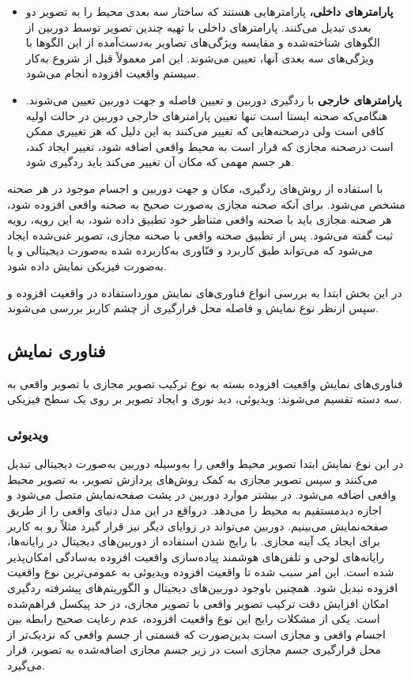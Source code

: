 \begin{itemize}
	\item \textbf{پارامترهای داخلی، }
 پارامترهایی هستند که ساختار سه بعدی محیط را به تصویر دو بعدی تبدیل می‌کنند. پارامترهای داخلی با تهیه چندین تصویر توسط دوربین از الگوهای شناخته‌شده و مقایسه ویژگی‌های تصاویر به‌دست‌آمده از این الگوها با ویژگی‌های سه بعدی آنها، تعیین می‌شوند. این امر معمولاً قبل از شروع به‌کار سیستم واقعیت افزوده انجام می‌شود.
 \item \textbf{پارامترهای خارجی}
   با ردگیری دوربین و تعیین فاصله و جهت دوربین تعیین می‌شوند. هنگامی‌که صحنه ایستا است تنها تعیین پارامترهای خارجی دوربین در حالت اولیه کافی است ولی درصحنه‌هایی که تغییر می‌کنند به این دلیل که هر تغییری ممکن است درصحنه مجازی که قرار است به محیط واقعی اضافه شود، تغییر ایجاد کند، هر جسم مهمی که مکان آن تغییر می‌کند باید ردگیری شود\cite{Billinghurst}.
\end{itemize}
با استفاده از روش‌های ردگیری، مکان و جهت دوربین و اجسام موجود در هر صحنه مشخص می‌شود. برای آنکه صحنه مجازی به‌صورت صحیح به صحنه واقعی افزوده شود، هر صحنه مجازی باید با صحنه واقعی متناظر خود تطبیق داده شود، به این رویه، رویه ثبت گفته می‌شود. پس از تطبیق صحنه واقعی با صحنه مجازی، تصویر غنی‌شده ایجاد می‌شود که می‌تواند طبق کاربرد و فنّاوری به‌کاربرده شده به‌صورت دیجیتالی و یا به‌صورت فیزیکی نمایش داده شود.

در این بخش ابتدا به بررسی انواع فناوری‌های نمایش مورداستفاده در واقعیت افزوده و سپس ازنظر نوع نمایش و فاصله محل قرارگیری از چشم کاربر بررسی می‌شوند.
\subsection{فناوری نمایش}
فناوری‌های نمایش واقعیت افزوده بسته به نوع ترکیب تصویر مجازی با تصویر واقعی به سه دسته تقسیم می‌شوند: ویدیوئی، دید نوری و ایجاد تصویر بر روی یک سطح فیزیکی.
\subsubsection{ویدیوئی}
در این نوع نمایش ابتدا تصویر محیط واقعی را به‌وسیله دوربین به‌صورت دیجیتالی تبدیل می‌کنند و سپس تصویر مجازی به کمک روش‌های پردازش تصویر، به تصویر محیط واقعی اضافه می‌شود. در بیشتر موارد دوربین در پشت صفحه‌نمایش متصل می‌شود و اجازه دیدمستقیم به محیط را می‌دهد. درواقع در این مدل دنیای واقعی را از طریق صفحه‌نمایش می‌بینیم. دوربین می‌تواند در زوایای دیگر نیز قرار گیرد مثلاً رو به کاربر برای ایجاد یک آینه مجازی\cite{Billinghurst}.
با رایج شدن استفاده از دوربین‌های دیجیتال در رایانه‌ها، رایانه‌های لوحی و تلفن‌های هوشمند پیاده‌سازی واقعیت افزوده به‌سادگی امکان‌پذیر شده است. این امر سبب شده تا واقعیت افزوده ویدیوئی به عمومی‌ترین نوع واقعیت افزوده تبدیل شود. همچنین باوجود دوربین‌های دیجیتال و الگوریتم‌های پیشرفته ردگیری امکان افزایش دقت ترکیب تصویر واقعی با تصویر مجازی، در حد پیکسل فراهم‌شده است. یکی از مشکلات رایج این نوع واقعیت افزوده، عدم رعایت صحیح رابطه بین اجسام واقعی و مجازی است بدین‌صورت که قسمتی از جسم واقعی که نزدیک‌تر از محل قرارگیری جسم مجازی است در زیر جسم مجازی اضافه‌شده به تصویر، قرار می‌گیرد\cite{Tian}.

